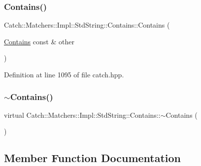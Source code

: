 \subsubsection{\texorpdfstring{Contains()}{Contains()}\hspace{0.1cm}{\footnotesize\ttfamily [2/2]}}
{\footnotesize\ttfamily Catch\+::\+Matchers\+::\+Impl\+::\+Std\+String\+::\+Contains\+::\+Contains (\begin{DoxyParamCaption}\item[{\hyperlink{struct_catch_1_1_matchers_1_1_impl_1_1_std_string_1_1_contains}{Contains} const \&}]{other }\end{DoxyParamCaption})\hspace{0.3cm}{\ttfamily [inline]}}



Definition at line 1095 of file catch.\+hpp.

\hypertarget{struct_catch_1_1_matchers_1_1_impl_1_1_std_string_1_1_contains_ae7a327dca00ff985b69b39bc883b7cb2}{}\label{struct_catch_1_1_matchers_1_1_impl_1_1_std_string_1_1_contains_ae7a327dca00ff985b69b39bc883b7cb2} 
\subsubsection{\texorpdfstring{$\sim$\+Contains()}{~Contains()}}
{\footnotesize\ttfamily virtual Catch\+::\+Matchers\+::\+Impl\+::\+Std\+String\+::\+Contains\+::$\sim$\+Contains (\begin{DoxyParamCaption}{ }\end{DoxyParamCaption})\hspace{0.3cm}{\ttfamily [virtual]}}



\subsection{Member Function Documentation}
\hypertarget{struct_catch_1_1_matchers_1_1_impl_1_1_std_string_1_1_contains_a2248f3d0d1eb5cf5a1059c183b811a7c}{}\label{struct_catch_1_1_matchers_1_1_impl_1_1_std_string_1_1_contains_a2248f3d0d1eb5cf5a1059c183b811a7c} 
